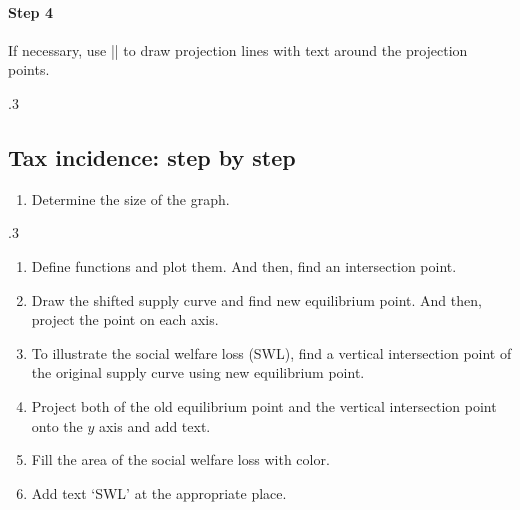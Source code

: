 \paragraph{Step 4} If necessary, use |\tzproj| to draw projection lines with text around the projection points.

\begin{tzcode}{.3}
\end{tzcode}

\subsection{Tax incidence: step by step}
\label{ssi:taxincidence}

\begin{enumerate}[{Step} 1{:}]
\item Determine the size of the graph.
\end{enumerate}

\begin{tzcode}{.3}
\end{tzcode}

\begin{enumerate}\addtocounter{enumi}{1}\renewcommand{\labelenumi}{{Step} \theenumi{:}}\firmlist
\item Define functions and plot them. And then, find an intersection point.
\item Draw the shifted supply curve and find new equilibrium point. And then, project the point on each axis.
\item To illustrate the social welfare loss (SWL), find a vertical intersection point of the original supply curve using new equilibrium point.
\item Project both of the old equilibrium point and the vertical intersection point onto the $y$ axis and add text.
\item Fill the area of the social welfare loss with color.
\item Add text `SWL' at the appropriate place. 
\end{enumerate}

